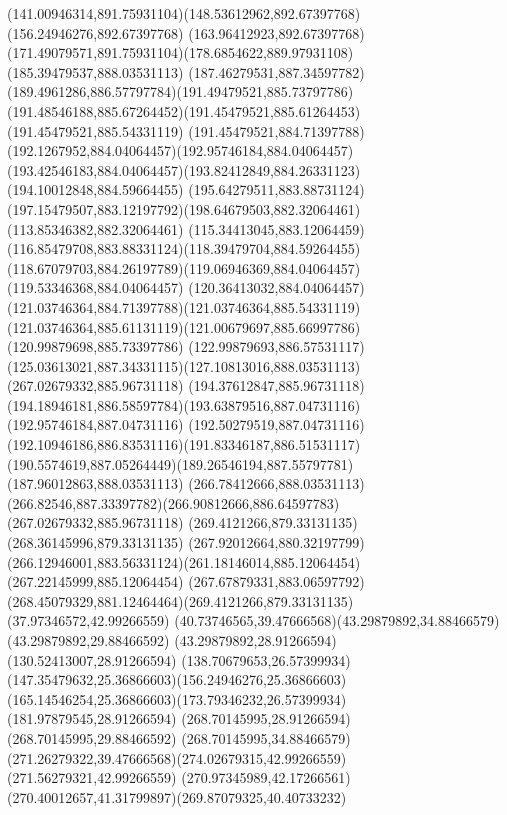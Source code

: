 {{		\curveto(141.00946314,891.75931104)(148.53612962,892.67397768)(156.24946276,892.67397768)
		\curveto(163.96412923,892.67397768)(171.49079571,891.75931104)(178.6854622,889.97931108)
		\moveto(185.39479537,888.03531113)
		\curveto(187.46279531,887.34597782)(189.4961286,886.57797784)(191.49479521,885.73797786)
		\curveto(191.48546188,885.67264452)(191.45479521,885.61264453)(191.45479521,885.54331119)
		\curveto(191.45479521,884.71397788)(192.1267952,884.04064457)(192.95746184,884.04064457)
		\curveto(193.42546183,884.04064457)(193.82412849,884.26331123)(194.10012848,884.59664455)
		\curveto(195.64279511,883.88731124)(197.15479507,883.12197792)(198.64679503,882.32064461)
		\lineto(113.85346382,882.32064461)
		\curveto(115.34413045,883.12064459)(116.85479708,883.88331124)(118.39479704,884.59264455)
		\curveto(118.67079703,884.26197789)(119.06946369,884.04064457)(119.53346368,884.04064457)
		\curveto(120.36413032,884.04064457)(121.03746364,884.71397788)(121.03746364,885.54331119)
		\curveto(121.03746364,885.61131119)(121.00679697,885.66997786)(120.99879698,885.73397786)
		\curveto(122.99879693,886.57531117)(125.03613021,887.34331115)(127.10813016,888.03531113)
		\closepath
		\moveto(267.02679332,885.96731118)
		\lineto(194.37612847,885.96731118)
		\curveto(194.18946181,886.58597784)(193.63879516,887.04731116)(192.95746184,887.04731116)
		\curveto(192.50279519,887.04731116)(192.10946186,886.83531116)(191.83346187,886.51531117)
		\curveto(190.5574619,887.05264449)(189.26546194,887.55797781)(187.96012863,888.03531113)
		\lineto(266.78412666,888.03531113)
		\curveto(266.82546,887.33397782)(266.90812666,886.64597783)(267.02679332,885.96731118)
		\moveto(269.4121266,879.33131135)
		\lineto(268.36145996,879.33131135)
		\curveto(267.92012664,880.32197799)(266.12946001,883.56331124)(261.18146014,885.12064454)
		\lineto(267.22145999,885.12064454)
		\curveto(267.67879331,883.06597792)(268.45079329,881.12464464)(269.4121266,879.33131135)
		\moveto(37.97346572,42.99266559)
		\curveto(40.73746565,39.47666568)(43.29879892,34.88466579)(43.29879892,29.88466592)
		\lineto(43.29879892,28.91266594)
		\lineto(130.52413007,28.91266594)
		\curveto(138.70679653,26.57399934)(147.35479632,25.36866603)(156.24946276,25.36866603)
		\curveto(165.14546254,25.36866603)(173.79346232,26.57399934)(181.97879545,28.91266594)
		\lineto(268.70145995,28.91266594)
		\lineto(268.70145995,29.88466592)
		\curveto(268.70145995,34.88466579)(271.26279322,39.47666568)(274.02679315,42.99266559)
		\lineto(271.56279321,42.99266559)
		\curveto(270.97345989,42.17266561)(270.40012657,41.31799897)(269.87079325,40.40733232)
}}
